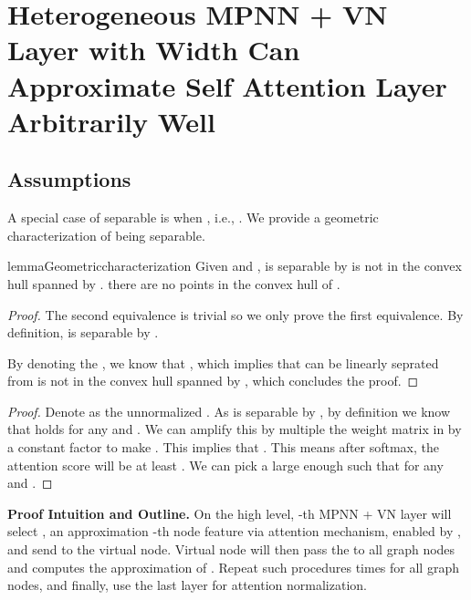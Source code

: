 \documentclass[nohyperref]{article}
\theoremstyle{plain}
\theoremstyle{definition}
\theoremstyle{remark}
\begin{document}
\section{ Heterogeneous MPNN + VN Layer with  Width Can Approximate  Self Attention Layer Arbitrarily Well}
\label{sec:approximate-full-self-attention}

\subsection{Assumptions}
\label{subsec:assumptions}

A special case of  separable is when , i.e., . We provide a geometric characterization of  being  separable. 
\begin{restatable}{lemma}{Geometriccharacterization}
\label{lemma:Geometric-characterization} Given  and ,  is  separable by     is not in the convex hull spanned by .  there are no points in the convex hull of .
\end{restatable}


\begin{proof}
The second equivalence is trivial so we only prove the first equivalence. By definition,  is  separable by     .


By denoting the , we know that , which implies that   can be linearly seprated from    is not in the convex hull spanned by , which concludes the proof. 
\end{proof}

\UniformSelection*
\begin{proof}
Denote  as the unnormalized . As  is  separable by , by definition we know that  holds for any  and . We can amplify this by multiple the weight matrix in  by a constant factor  to make . This implies that . This means after softmax, the attention score  will be at least . We can pick a large enough  such that  for any  and .
\end{proof}















\textbf{Proof Intuition and Outline.} On the high level, -th MPNN + VN layer will select , an approximation -th node feature  via attention mechanism, enabled by , and send  to the virtual node. Virtual node will then pass the  to all graph nodes and computes the approximation of . Repeat such procedures  times for all graph nodes, and finally, use the last layer for attention normalization. 
\end{document}

